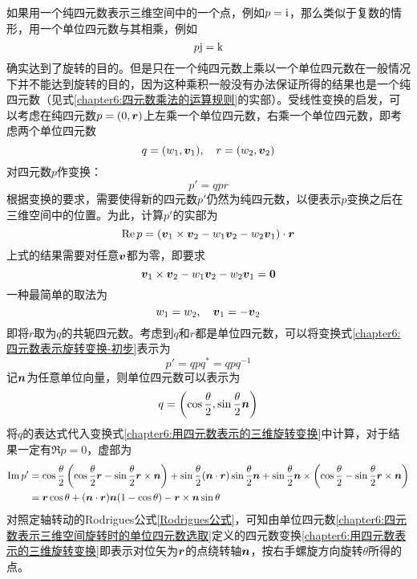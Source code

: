 如果用一个纯四元数表示三维空间中的一个点，例如$p=\mathrm{i}$，那么类似于复数的情形，用一个单位四元数与其相乘，例如
\begin{equation*}
	p\mathrm{j} = \mathrm{k}
\end{equation*}
确实达到了旋转的目的。但是只在一个纯四元数上乘以一个单位四元数在一般情况下并不能达到旋转的目的，因为这种乘积一般没有办法保证所得的结果也是一个纯四元数（见式\eqref{chapter6:四元数乘法的运算规则}的实部）。受线性变换的启发，可以考虑在纯四元数$p=(0,\boldsymbol{r})$上左乘一个单位四元数，右乘一个单位四元数，即考虑两个单位四元数
\begin{equation}
	q = (w_1,\boldsymbol{v}_1),\quad r = (w_2,\boldsymbol{v}_2)
\end{equation}
对四元数$p$作变换：
\begin{equation}
	p' = qpr
	\label{chapter6:四元数表示旋转变换-初步}
\end{equation}
根据变换的要求，需要使得新的四元数$p'$仍然为纯四元数，以便表示$p$变换之后在三维空间中的位置。为此，计算$p'$的实部为
\begin{equation}
	\mathrm{Re}\, p = (\boldsymbol{v}_1\times \boldsymbol{v}_2-w_1\boldsymbol{v}_2-w_2\boldsymbol{v}_1)\cdot \boldsymbol{r}
\end{equation}
上式的结果需要对任意$\boldsymbol{v}$都为零，即要求
\begin{equation}
	\boldsymbol{v}_1\times \boldsymbol{v}_2-w_1\boldsymbol{v}_2-w_2\boldsymbol{v}_1 = \boldsymbol{0}
\end{equation}
一种最简单的取法为
\begin{equation}
	w_1=w_2,\quad \boldsymbol{v}_1=-\boldsymbol{v}_2
\end{equation}
即将$r$取为$q$的共轭四元数。考虑到$q$和$r$都是单位四元数，可以将变换式\eqref{chapter6:四元数表示旋转变换-初步}表示为
\begin{equation}
	p' = qpq^* = qpq^{-1}
	\label{chapter6:用四元数表示的三维旋转变换}
\end{equation}
记$\boldsymbol{n}$为任意单位向量，则单位四元数可以表示为
\begin{equation}
	q = \left(\cos\frac{\theta}{2},\sin\frac{\theta}{2}\boldsymbol{n}\right)
	\label{chapter6:四元数表示三维空间旋转时的单位四元数选取}
\end{equation}
将$q$的表达式代入变换式\eqref{chapter6:用四元数表示的三维旋转变换}中计算，对于结果一定有$\Re p = 0$，虚部为
\begin{align}
	\mathrm{Im}\, p' & = \cos\frac{\theta}{2}\left(\cos\frac{\theta}{2}\boldsymbol{r}-\sin\frac{\theta}{2}\boldsymbol{r}\times \boldsymbol{n}\right) + \sin\frac{\theta}{2} (\boldsymbol{n}\cdot \boldsymbol{r}) \sin\frac{\theta}{2}\boldsymbol{n} + \sin\frac{\theta}{2}\boldsymbol{n} \times \left(\cos\frac{\theta}{2}-\sin\frac{\theta}{2}\boldsymbol{r}\times \boldsymbol{n}\right) \nonumber \\
	& = \boldsymbol{r}\cos\theta + (\boldsymbol{n}\cdot \boldsymbol{r})\boldsymbol{n}(1-\cos\theta) - \boldsymbol{r}\times \boldsymbol{n}\sin\theta
\end{align}
对照定轴转动的Rodrigues公式\eqref{Rodrigues公式}，可知由单位四元数\eqref{chapter6:四元数表示三维空间旋转时的单位四元数选取}定义的四元数变换\eqref{chapter6:用四元数表示的三维旋转变换}即表示对位矢为$\boldsymbol{r}$的点绕转轴$\boldsymbol{n}$，按右手螺旋方向旋转$\theta$所得的点。

